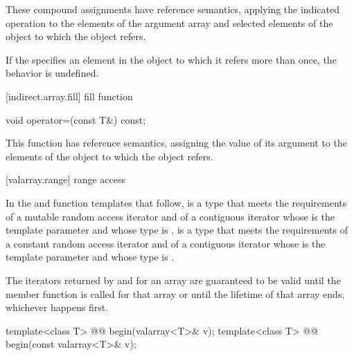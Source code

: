 \begin{itemdescr}
\pnum
These compound assignments have reference semantics, applying the indicated
operation to the elements of the argument array and selected elements of the
object to which the
object refers.

\pnum
If the
specifies an element in the
object to which it refers more than once,
the behavior is undefined.
\end{itemdescr}

[indirect.array.fill]{ fill function}

%
\begin{itemdecl}
void operator=(const T&) const;
\end{itemdecl}

\begin{itemdescr}
\pnum
This function has reference semantics, assigning the value of its argument
to the elements of the
object to which the
object refers.
\end{itemdescr}

[valarray.range]{ range access}

\pnum
In the  and  function templates that follow, 
is a type that meets the requirements of a mutable random access
iterator
and of a contiguous iterator
whose  is the template
parameter  and whose  type is .  is a
type that meets the requirements of a constant random access
iterator
and of a contiguous iterator
whose  is the template
parameter  and whose  type is .

\pnum
The iterators returned by  and  for an array
are guaranteed to be valid until the member function
 is called for that
array or until the lifetime of that array ends, whichever happens
first.

%
\begin{itemdecl}
template<class T> @@ begin(valarray<T>& v);
template<class T> @@ begin(const valarray<T>& v);
\end{itemdecl}

